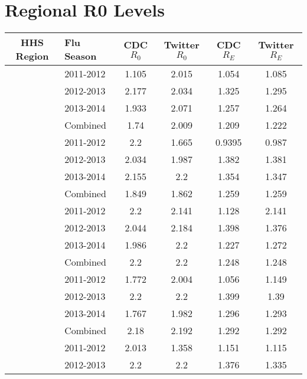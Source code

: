 \chapter{Regional R0 Levels}
\label{appendix:regionalr0}
\begin{longtable}{|c|l|c|c|c|c|}
\hline
HHS Region & Flu Season & CDC \(R_0\) & Twitter \(R_0\) & CDC \(R_E\) & Twitter \(R_E\) \\ \hline
  {\multirow{4}{*}{ 1 }} & 2011-2012 & 1.105  &  2.015 &   1.054  &   1.085  \\ \cline{2-6}
  & 2012-2013  & 2.177  &  2.034 &   1.325  &   1.295  \\ \cline{2-6}
  & 2013-2014 & 1.933  &  2.071 &   1.257  &   1.264  \\ \cline{2-6}
  & Combined  & 1.74  &  2.009 &   1.209  &   1.222  \\ \cline{1-6}
 {\multirow{4}{*}{ 2 }} & 2011-2012 & 2.2  &  1.665 &   0.9395  &   0.987  \\ \cline{2-6}
  & 2012-2013  & 2.034  &  1.987 &   1.382  &   1.381  \\ \cline{2-6}
  & 2013-2014 & 2.155  &  2.2 &   1.354  &   1.347  \\ \cline{2-6}
  & Combined  & 1.849  &  1.862 &   1.259  &   1.259  \\ \cline{1-6}
 {\multirow{4}{*}{ 3 }} & 2011-2012 & 2.2  &  2.141 &   1.128  &   2.141  \\ \cline{2-6}
  & 2012-2013  & 2.044  &  2.184 &   1.398  &   1.376  \\ \cline{2-6}
  & 2013-2014 & 1.986  &  2.2 &   1.227  &   1.272  \\ \cline{2-6}
  & Combined  & 2.2  &  2.2 &   1.248  &   1.248  \\ \cline{1-6}
 {\multirow{4}{*}{ 4 }} & 2011-2012 & 1.772  &  2.004 &   1.056  &   1.149  \\ \cline{2-6}
  & 2012-2013  & 2.2  &  2.2 &   1.399  &   1.39  \\ \cline{2-6}
  & 2013-2014 & 1.767  &  1.982 &   1.296  &   1.293  \\ \cline{2-6}
  & Combined  & 2.18  &  2.192 &   1.292  &   1.292  \\ \cline{1-6}
 {\multirow{4}{*}{ 5 }} & 2011-2012 & 2.013  &  1.358 &   1.151  &   1.115  \\ \cline{2-6}
  & 2012-2013  & 2.2  &  2.2 &   1.376  &   1.335  \\ \cline{2-6}

\end{longtable}

